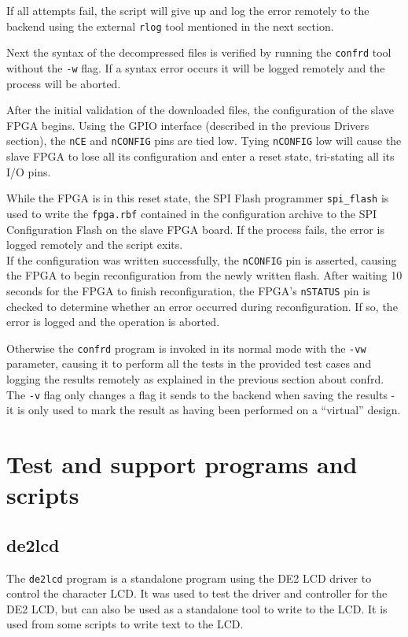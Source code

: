 If all attempts fail, the script will give up and log the error remotely to the backend using the
external \texttt{rlog} tool mentioned in the next section.

Next the syntax of the decompressed files is verified by running the \texttt{confrd} tool
without the \texttt{-w} flag. If a syntax error occurs it will be logged remotely and the process
will be aborted.

After the initial validation of the downloaded files, the configuration of the slave FPGA
begins. Using the GPIO interface (described in the previous Drivers section), the \texttt{nCE}
and \texttt{nCONFIG} pins are tied low. Tying \texttt{nCONFIG} low will cause the slave FPGA
to lose all its configuration and enter a reset state, tri-stating all its I/O pins.

While the FPGA is in this reset state, the SPI Flash programmer \texttt{spi\_flash} is used
to write the \texttt{fpga.rbf} contained in the configuration archive to the SPI Configuration
Flash on the slave FPGA board. If the process fails, the error is logged remotely and the
script exits.
\\

If the configuration was written successfully, the \texttt{nCONFIG} pin is asserted, causing
the FPGA to begin reconfiguration from the newly written flash. After waiting 10 seconds
for the FPGA to finish reconfiguration, the FPGA's \texttt{nSTATUS} pin is checked to determine
whether an error occurred during reconfiguration. If so, the error is logged and the operation
is aborted.

Otherwise the \texttt{confrd} program is invoked in its normal mode with the \texttt{-vw} parameter,
causing it to perform all the tests in the provided test cases and logging the results remotely
as explained in the previous section about confrd. The \texttt{-v} flag only changes a flag it sends
to the backend when saving the results - it is only used to mark the result as having been performed
on a ``virtual'' design.


\newpage
\section{Test and support programs and scripts}
\subsection{de2lcd}
The \texttt{de2lcd} program is a standalone program using the DE2 LCD driver to control
the character LCD. It was used to test the driver and controller for the DE2 LCD, but
can also be used as a standalone tool to write to the LCD. It is used from some scripts
to write text to the LCD.


